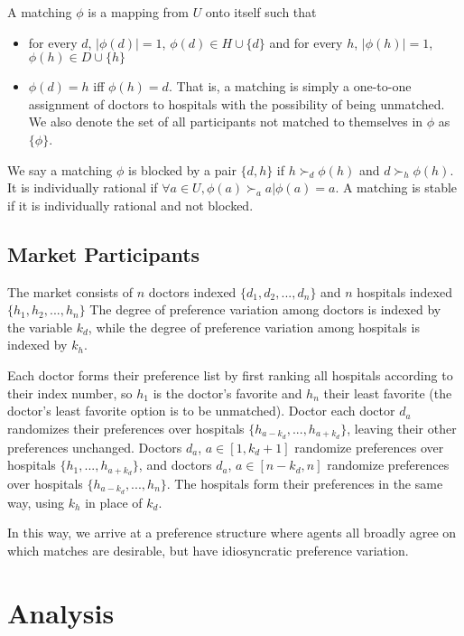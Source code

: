 \documentclass[WP]{AEA}
\begin{document}
A matching $\phi$ is a mapping from $U$ onto itself such that 
\begin{itemize}
	\item for every $d$, $|\phi(d)| = 1$, $\phi(d) \in H \cup \{d\} $ and for every  $h$, $|\phi(h)| = 1$, $\phi(h) \in D \cup \{h\}$
	\item $\phi(d) = h$ iff $\phi(h) = d$.  That is, a matching is simply a one-to-one assignment of doctors to hospitals with the possibility of being unmatched. We also denote the set of all participants not matched to themselves in $\phi$ as $\{\phi\}$.
\end{itemize}
We say a matching $\phi$ is blocked by a pair $\{d,h\}$ if $h \succ_d \phi(h)$ and $d \succ_h \phi(h)$. It is individually rational if $\forall a \in U ,\phi(a) \succ_a a \vert \phi(a) = a$. A matching is stable if it is individually rational and not blocked.

\subsection{Market Participants}

The market consists of $n$ doctors  indexed $\{ d_1, d_2, ... ,d_n\}$ and  $n$ hospitals  indexed $\{ h_1, h_2, ... ,h_n\}$ The degree of preference variation among doctors is indexed by the variable $k_d$, while the degree of preference variation among hospitals is indexed by $k_h$.
	
Each doctor forms their preference list by first ranking all hospitals according to their index number, so $h_1$ is the doctor's favorite and $h_n$ their least favorite (the doctor's least favorite option is to be unmatched).  
Doctor each doctor $d_a$ randomizes their preferences over hospitals $\{h_{a-k_d},...,h_{a+k_d}\}$, leaving their other preferences unchanged.  Doctors $d_a$, $a \in [1,k_d+1]$ randomize preferences over hospitals  $\{h_{1},...,h_{a+k_d}\}$, and doctors $d_a$, $a \in [n-k_d,n]$ randomize preferences over hospitals  $\{h_{a-k_d},...,h_{n}\}$.  
The hospitals form their preferences in the same way, using $k_h$ in place of $k_d$.

In this way, we arrive at a preference structure where agents all broadly agree on which matches are desirable, but have idiosyncratic preference variation.

\section{Analysis}
\end{document}
